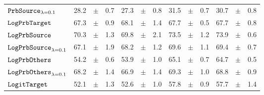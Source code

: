 \documentclass[../main.tex]{subfiles}
\begin{document}
\begin{tabular}{lrrrrrrrrrrrr}
$\mathtt{PrbSource}_{\lambda=0.1}$      & 28.2                            & $\pm$                                        & 0.7                        & 27.3                                                                                   & $\pm$ & 0.8                                & 31.5  & $\pm$ & 0.7             & 30.7  & $\pm$ & 0.8                           \\
$\mathtt{LogPrbTarget}$                & 67.3                            & $\pm$                                        & 0.9                        & 68.1                                                                                     & $\pm$ & 1.4                                & 67.7  & $\pm$ & 0.5             & 67.7  & $\pm$ & 0.8                           \\
$\mathtt{LogPrbSource}_{}$              & 70.3                            & $\pm$                                        & 1.3                        & 69.8                                                                                   & $\pm$ & 2.1                                & 73.5  & $\pm$ & 1.2             & 73.9  & $\pm$ & 0.6                           \\
$\mathtt{LogPrbSource}_{\lambda=0.1}$   & 67.1                            & $\pm$                                        & 1.9                        & 68.2                                                                                   & $\pm$ & 1.2                                & 69.6  & $\pm$ & 1.1             & 69.4  & $\pm$ & 0.7                           \\
$\mathtt{LogPrbOthers}_{}$              & 54.2                            & $\pm$                                        & 0.6                        & 53.9                                                                                 & $\pm$ & 1.0                                & 65.1  & $\pm$ & 0.7             & 64.7  & $\pm$ & 0.5                           \\
$\mathtt{LogPrbOthers}_{\lambda=0.1}$   & 68.2                            & $\pm$                                        & 1.4                        & 66.9                                                                                   & $\pm$ & 1.4                                & 69.3  & $\pm$ & 1.0             & 68.8  & $\pm$ & 0.9                           \\
$\mathtt{LogitTarget}$                 & 52.1                            & $\pm$                                        & 1.3                        & 52.6                                                                                     & $\pm$ & 1.0                                & 57.8  & $\pm$ & 0.9             & 57.7  & $\pm$ & 1.4                           \\

\end{tabular}
\end{document}
